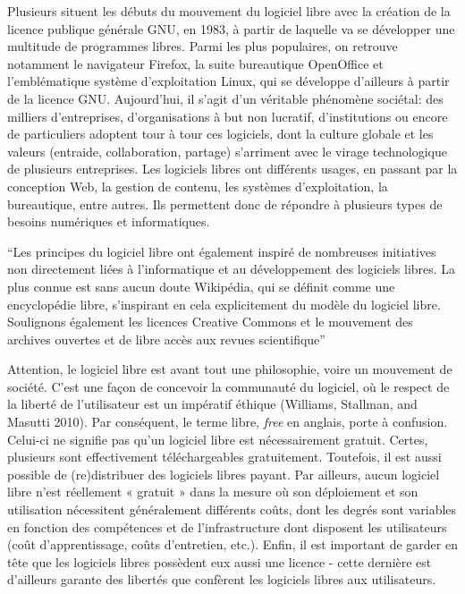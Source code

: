 \documentclass[
  letterpaper,
]{scrbook}
\begin{document}
Plusieurs situent les débuts du mouvement du logiciel libre avec la
création de la licence publique générale GNU, en 1983, à partir de
laquelle va se développer une multitude de programmes libres. Parmi les
plus populaires, on retrouve notamment le navigateur Firefox, la suite
bureautique OpenOffice et l'emblématique système d'exploitation Linux,
qui se développe d'ailleurs à partir de la licence GNU. Aujourd'hui, il
s'agit d'un véritable phénomène sociétal: des milliers d'entreprises,
d'organisations à but non lucratif, d'institutions ou encore de
particuliers adoptent tour à tour ces logiciels, dont la culture globale
et les valeurs (entraide, collaboration, partage) s'arriment avec le
virage technologique de plusieurs entreprises. Les logiciels libres ont
différents usages, en passant par la conception Web, la gestion de
contenu, les systèmes d'exploitation, la bureautique, entre autres. Ils
permettent donc de répondre à plusieurs types de besoins numériques et
informatiques.

``Les principes du logiciel libre ont également inspiré de nombreuses
initiatives non directement liées à l'informatique et au développement
des logiciels libres. La plus connue est sans aucun doute Wikipédia, qui
se définit comme une encyclopédie libre, s'inspirant en cela
explicitement du modèle du logiciel libre. Soulignons également les
licences Creative Commons et le mouvement des archives ouvertes et de
libre accès aux revues scientifique''

Attention, le logiciel libre est avant tout une philosophie, voire un
mouvement de société. C'est une façon de concevoir la communauté du
logiciel, où le respect de la liberté de l'utilisateur est un impératif
éthique (Williams, Stallman, and Masutti 2010). Par conséquent, le terme
libre, \emph{free} en anglais, porte à confusion. Celui-ci ne signifie
pas qu'un logiciel libre est nécessairement gratuit. Certes, plusieurs
sont effectivement téléchargeables gratuitement. Toutefois, il est aussi
possible de (re)distribuer des logiciels libres payant. Par ailleurs,
aucun logiciel libre n'est réellement « gratuit » dans la mesure où son
déploiement et son utilisation nécessitent généralement différents
coûts, dont les degrés sont variables en fonction des compétences et de
l'infrastructure dont disposent les utilisateurs (coût d'apprentissage,
coûts d'entretien, etc.). Enfin, il est important de garder en tête que
les logiciels libres possèdent eux aussi une licence - cette dernière
est d'ailleurs garante des libertés que confèrent les logiciels libres
aux utilisateurs.
\end{document}
